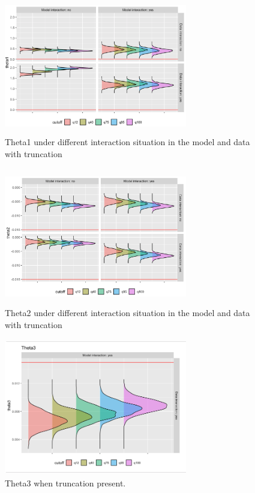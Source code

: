 \documentclass{article}
\begin{document}
\begin{figure}[h]
\centering
\includegraphics[width = 8cm,height = 6cm]{figure-7.png}
\caption{Theta1 under different interaction situation in the model and data with truncation}
\label{fig7}
\end{figure}

\begin{figure}[h]
\centering
\includegraphics[width = 8cm,height = 6cm]{figure-8.png}
\caption{Theta2 under different interaction situation in the model and data with truncation} 
\label{fig8}
\end{figure}


\begin{figure}[h]
\centering
\includegraphics[width = 8cm,height = 6cm]{figure-9.png}
\caption{Theta3 when truncation present.}
\label{fig9}
\end{figure}
\end{document}
